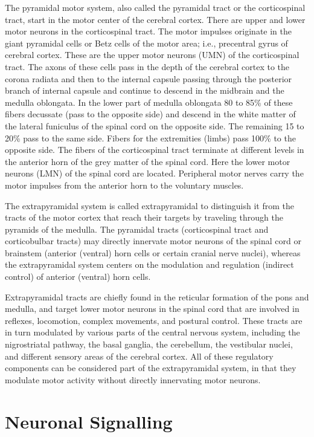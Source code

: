 The pyramidal motor system, also called the pyramidal tract or the corticospinal tract, start in the motor center of the cerebral cortex. There are upper and lower motor neurons in the corticospinal tract. The motor impulses originate in the giant pyramidal cells or Betz cells of the motor area; i.e., precentral gyrus of cerebral cortex. These are the upper motor neurons (UMN) of the corticospinal tract. The axons of these cells pass in the depth of the cerebral cortex to the corona radiata and then to the internal capsule passing through the posterior branch of internal capsule and continue to descend in the midbrain and the medulla oblongata. In the lower part of medulla oblongata 80 to 85\% of these fibers decussate (pass to the opposite side) and descend in the white matter of the lateral funiculus of the spinal cord on the opposite side. The remaining 15 to 20\% pass to the same side. Fibers for the extremities (limbs) pass 100\% to the opposite side. The fibers of the corticospinal tract terminate at different levels in the anterior horn of the grey matter of the spinal cord. Here the lower motor neurons (LMN) of the spinal cord are located. Peripheral motor nerves carry the motor impulses from the anterior horn to the voluntary muscles.

The extrapyramidal system is called extrapyramidal to distinguish it from the tracts of the motor cortex that reach their targets by traveling through the pyramids of the medulla. The pyramidal tracts (corticospinal tract and corticobulbar tracts) may directly innervate motor neurons of the spinal cord or brainstem (anterior (ventral) horn cells or certain cranial nerve nuclei), whereas the extrapyramidal system centers on the modulation and regulation (indirect control) of anterior (ventral) horn cells.

Extrapyramidal tracts are chiefly found in the reticular formation of the pons and medulla, and target lower motor neurons in the spinal cord that are involved in reflexes, locomotion, complex movements, and postural control. These tracts are in turn modulated by various parts of the central nervous system, including the nigrostriatal pathway, the basal ganglia, the cerebellum, the vestibular nuclei, and different sensory areas of the cerebral cortex. All of these regulatory components can be considered part of the extrapyramidal system, in that they modulate motor activity without directly innervating motor neurons.

\hypertarget{neuronal-signalling}{%
\section{Neuronal Signalling}\label{neuronal-signalling}}

